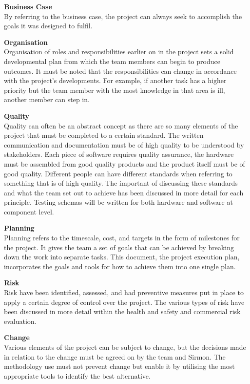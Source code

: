 \documentclass [12pt]{article}
\begin{document}
\textbf{Business Case}\\
By referring to the business case, the project can always seek to accomplish the goals it was designed to fulfil.

\textbf{Organisation}\\
Organisation of roles and responsibilities earlier on in the project sets a solid developmental plan from which the team members can begin to produce outcomes. It must be noted that the responsibilities can change in accordance with the project’s developments. For example, if another task has a higher priority but the team member with the most knowledge in that area is ill, another member can step in.

\textbf{Quality}\\
Quality can often be an abstract concept as there are so many elements of the project that must be completed to a certain standard. The written communication and documentation must be of high quality to be understood by stakeholders. Each piece of software requires quality assurance, the hardware must be assembled from good quality products and the product itself must be of good quality. Different people can have different standards when referring to something that is of high quality. The important of discussing these standards and what the team set out to achieve has been discussed in more detail for each principle. Testing schemas will be written for both hardware and software at component level.

\textbf{Planning}\\
Planning refers to the timescale, cost, and targets in the form of milestones for the project. It gives the team a set of goals that can be achieved by breaking down the work into separate tasks. This document, the project execution plan, incorporates the goals and tools for how to achieve them into one single plan.

\textbf{Risk}\\
Risk have been identified, assessed, and had preventive measures put in place to apply a certain degree of control over the project. The various types of risk have been discussed in more detail within the health and safety and commercial risk evaluation.

\textbf{Change}\\
Various elements of the project can be subject to change, but the decisions made in relation to the change must be agreed on by the team and Sirmon. The methodology use must not prevent change but enable it by utilising the most appropriate tools to identify the best alternative.
\end{document}
